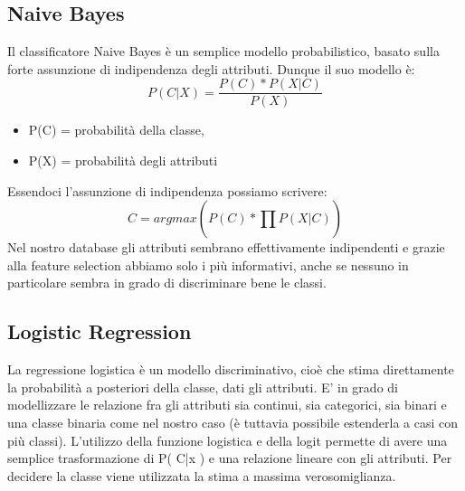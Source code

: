 \documentclass[a4paper, 12p]{report}
\begin{document}
	\subsection{Naive Bayes}
	Il classificatore Naive Bayes è un semplice modello probabilistico, basato sulla forte assunzione di indipendenza degli attributi. Dunque il suo modello è: 
	\begin{equation}
	P(C|X) = \frac{P(C)*P(X|C)}{P(X)}
	\end{equation}
	\begin{itemize}
		\item P(C) = probabilità della classe,
		\item P(X) = probabilità degli attributi
	\end{itemize}
	Essendoci l'assunzione di indipendenza possiamo scrivere:
	\begin{equation}
	C = argmax (P(C)*\prod_{}{}{P(X|C)})
	\end{equation}
	Nel nostro database gli attributi sembrano effettivamente indipendenti e grazie alla feature selection abbiamo solo i più informativi, anche se nessuno in particolare sembra in grado di discriminare bene le classi.
	\subsection{Logistic Regression}
	La regressione logistica è un modello discriminativo, cioè che stima direttamente la probabilità a posteriori della classe, dati gli attributi. E' in grado di modellizzare le relazione fra gli attributi sia continui, sia categorici, sia binari e una classe binaria come nel nostro caso (è tuttavia possibile estenderla a casi con più classi). L'utilizzo della funzione logistica e della logit permette di avere una semplice trasformazione di P( C|x ) e una relazione lineare con gli attributi. Per decidere la classe viene utilizzata la stima a massima verosomiglianza.
\end{document}
